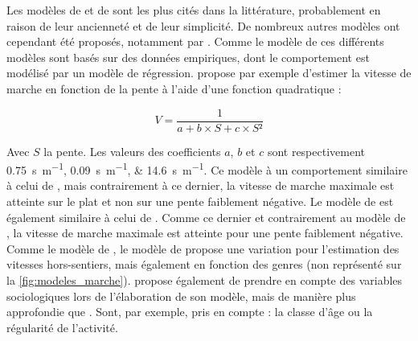 Les modèles de \textcite{Tobler1993} et de 
sont les plus cités dans la littérature, probablement en raison de
leur ancienneté et de leur simplicité. De nombreux autres modèles ont
cependant été proposés, notamment par
\textcite{Rees2004,Irmischer2017,Kerouanton2020}. Comme le modèle de
\textcite{Tobler1993} ces différents modèles sont basés sur des
données empiriques, dont le comportement est modélisé par un modèle de
régression. \textcite{Rees2004} propose par exemple d'estimer la
vitesse de marche en fonction de la pente à l'aide d'une fonction
quadratique :

\begin{equation}
  V = \dfrac{1}{a + b × S + c × S²}
\end{equation}

Avec \(S\) la pente. Les valeurs des coefficients \(a\), \(b\) et
\(c\) sont respectivement
\SIlist{0,75;0,09;14,6}{\second\per\meter}. Ce modèle à un
comportement similaire à celui de \textcite{Tobler1993}, mais
contrairement à ce dernier, la vitesse de marche maximale est atteinte
sur le plat et non sur une pente faiblement négative. Le modèle de
\textcite{Irmischer2017} est également similaire à celui de
\textcite{Tobler1993}. Comme ce dernier et contrairement au modèle de
\textcite{Rees2004}, la vitesse de marche maximale est atteinte pour
une pente faiblement négative. Comme le modèle de
\textcite{Tobler1993}, le modèle de \textcite{Irmischer2017} propose
une variation pour l'estimation des vitesses hors-sentiers, mais
également en fonction des genres (non représenté sur la
\autoref{fig:modeles_marche}). \textcite{Kerouanton2020} propose
également de prendre en compte des variables sociologiques lors de
l'élaboration de son modèle, mais de manière plus approfondie que
\textcite{Irmischer2017}. Sont, par exemple, pris en compte : la
classe d'âge ou la régularité de l'activité.

